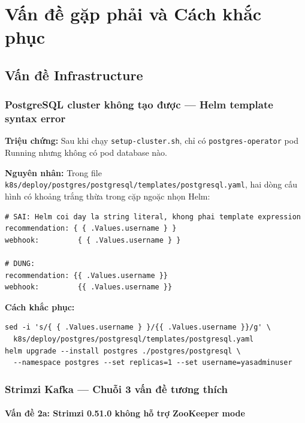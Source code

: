 \chapter{Vấn đề gặp phải và Cách khắc phục}

\section{Vấn đề Infrastructure}

\subsection{PostgreSQL cluster không tạo được — Helm template syntax error}

\textbf{Triệu chứng:} Sau khi chạy \texttt{setup-cluster.sh}, chỉ có
\texttt{postgres-operator} pod Running nhưng không có pod database nào.

\textbf{Nguyên nhân:} Trong file \texttt{k8s/deploy/postgres/postgresql/templates/postgresql.yaml},
hai dòng cấu hình có khoảng trắng thừa trong cặp ngoặc nhọn Helm:

\begin{lstlisting}[style=yamlstyle, caption=Lỗi Helm template syntax]
# SAI: Helm coi day la string literal, khong phai template expression
recommendation: { { .Values.username } }
webhook:         { { .Values.username } }

# DUNG:
recommendation: {{ .Values.username }}
webhook:         {{ .Values.username }}
\end{lstlisting}

\textbf{Cách khắc phục:}
\begin{lstlisting}[style=bashstyle]
sed -i 's/{ { .Values.username } }/{{ .Values.username }}/g' \
  k8s/deploy/postgres/postgresql/templates/postgresql.yaml
helm upgrade --install postgres ./postgres/postgresql \
  --namespace postgres --set replicas=1 --set username=yasadminuser
\end{lstlisting}

\subsection{Strimzi Kafka — Chuỗi 3 vấn đề tương thích}

\subsubsection{Vấn đề 2a: Strimzi 0.51.0 không hỗ trợ ZooKeeper mode}


